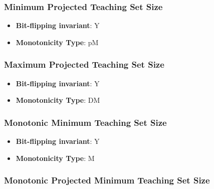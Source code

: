 \subsubsection{Minimum Projected Teaching Set Size}
      
      \begin{definition}\label{def:minimum_projected_teaching_set_size}
      
      \end{definition}
      \begin{itemize}
      \item {\bf Bit-flipping invariant}: Y
      \item {\bf Monotonicity Type}: pM
      \end{itemize}
\subsubsection{Maximum Projected Teaching Set Size}
      
      \begin{definition}\label{def:maximum_projected_teaching_set_size}
      
      \end{definition}
      \begin{itemize}
      \item {\bf Bit-flipping invariant}: Y
      \item {\bf Monotonicity Type}: DM
      \end{itemize}
\subsubsection{Monotonic Minimum Teaching Set Size}
      
      \begin{definition}\label{def:monotonic_minimum_teaching_set_size}
      
      \end{definition}
      \begin{itemize}
      \item {\bf Bit-flipping invariant}: Y
      \item {\bf Monotonicity Type}: M
      \end{itemize}
\subsubsection{Monotonic Projected Minimum Teaching Set Size}
      
